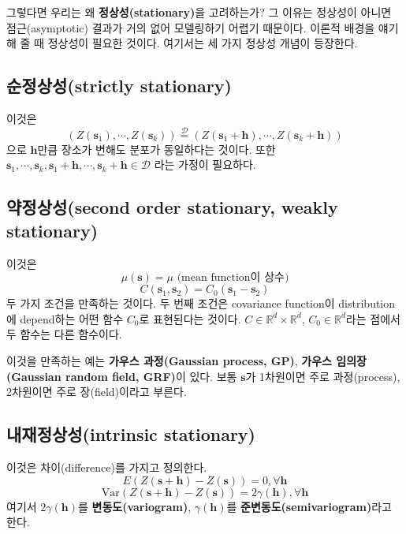 \documentclass[b5paper,]{scrbook}
\theoremstyle{plain}
\theoremstyle{definition}
\numberwithin{equation}{section}
\begin{document}
그렇다면 우리는 왜 \textbf{정상성(stationary)}을 고려하는가? 그 이유는
정상성이 아니면 점근(asymptotic) 결과가 거의 없어 모델링하기 어렵기
때문이다. 이론적 배경을 얘기해 줄 때 정상성이 필요한 것이다. 여기서는 세
가지 정상성 개념이 등장한다.

\subsection{순정상성(strictly stationary)}\label{strictly-stationary}

이것은
\[(Z(\mathbf{s}_{1}), \cdots , Z(\mathbf{s}_{k})) \stackrel{\mathcal{D}}{=} (Z(\mathbf{s}_{1}+\mathbf{h}), \cdots , Z(\mathbf{s}_{k}+\mathbf{h}))\]
으로 \(\mathbf{h}\)만큼 장소가 변해도 분포가 동일하다는 것이다. 또한
\(\mathbf{s}_{1}, \cdots , \mathbf{s}_{k}, \mathbf{s}_{1}+\mathbf{h}, \cdots , \mathbf{s}_{k}+\mathbf{h} \in \mathcal{D}\)
라는 가정이 필요하다.

\subsection{약정상성(second order stationary, weakly
stationary)}\label{second-order-stationary-weakly-stationary}

이것은 \[\mu(\mathbf{s})=\mu \text{ (mean function이 상수)}\]
\[C(\mathbf{s}_{1},\mathbf{s}_{2})=C_{0}(\mathbf{s}_{1}-\mathbf{s}_{2})\]
두 가지 조건을 만족하는 것이다. 두 번째 조건은 covariance function이
distribution에 depend하는 어떤 함수 \(C_{0}\)로 표현된다는 것이다.
\(C \in \mathbb{R}^{d}\times \mathbb{R}^{d}\),
\(C_{0} \in \mathbb{R}^{d}\)라는 점에서 두 함수는 다른 함수이다.

이것을 만족하는 예는 \textbf{가우스 과정(Gaussian process, GP)},
\textbf{가우스 임의장(Gaussian random field, GRF)}이 있다. 보통
\(\mathbf{s}\)가 1차원이면 주로 과정(process), 2차원이면 주로
장(field)이라고 부른다.

\subsection{내재정상성(intrinsic
stationary)}\label{intrinsic-stationary}

이것은 차이(difference)를 가지고 정의한다.
\[E(Z(\mathbf{s}+\mathbf{h})-Z(\mathbf{s}))=0, \forall \mathbf{h}\]
\[\text{Var}(Z(\mathbf{s}+\mathbf{h})-Z(\mathbf{s}))=2\gamma(\mathbf{h}), \forall \mathbf{h}\]
여기서 \(2\gamma(\mathbf{h})\)를 \textbf{변동도(variogram)},
\(\gamma(\mathbf{h})\)를 \textbf{준변동도(semivariogram)}라고 한다.
\end{document}
